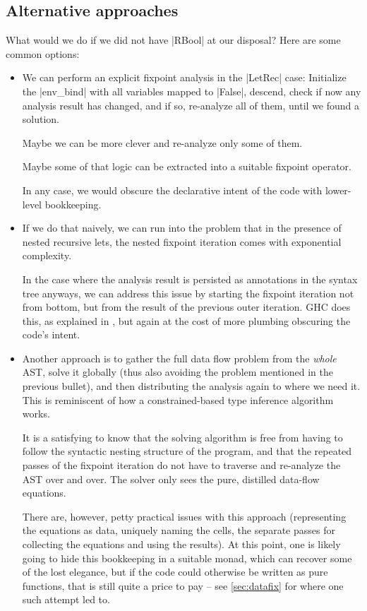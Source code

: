 \documentclass[manuscript,screen,acmsmall,nonacm]{acmart}
\begin{document}

\subsection{Alternative approaches}\label{sec:casestudyalts}
What would we do if we did not have |RBool| at our disposal? Here are some common options:
\begin{itemize}
\item We can perform an explicit fixpoint analysis in the |LetRec| case: Initialize the |env_bind| with all variables mapped to |False|, descend, check if now any analysis result has changed, and if so, re-analyze all of them, until we found a solution.

Maybe we can be more clever and re-analyze only some of them.

Maybe some of that logic can be extracted into a suitable fixpoint operator.

In any case, we would obscure the declarative intent of the code with lower-level bookkeeping.

\item If we do that naively, we can run into the problem that in the presence of nested recursive lets, the nested fixpoint iteration comes with exponential complexity.

In the case where the analysis result is persisted as annotations in the syntax tree anyways, we can address this issue by starting the fixpoint iteration not from bottom, but from the result of the previous outer iteration.
%
GHC does this, as explained in \citet[Section 6.6]{modular}, but again at the cost of more plumbing obscuring the code's intent.

\item Another approach is to gather the full data flow problem from the \emph{whole} AST, solve it globally (thus also avoiding the problem mentioned in the previous bullet), and then distributing the analysis again to where we need it. This is reminiscent of how a constrained-based type inference algorithm works.

It is a satisfying to know that the solving algorithm is free from having to follow the syntactic nesting structure of the program, and that the repeated passes of the fixpoint iteration do not have to traverse and re-analyze the AST over and over. The solver only sees the pure, distilled data-flow equations.

There are, however, petty practical issues with this approach (representing the equations as data, uniquely naming the cells, the separate passes for collecting the equations and using the results).
At this point, one is likely going to hide this bookkeeping in a suitable monad, which can recover some of the lost elegance, but if the code could otherwise be written as pure functions, that is still quite a price to pay -- see \cref{sec:datafix} for where one such attempt led to.
\end{itemize}
\end{document}
